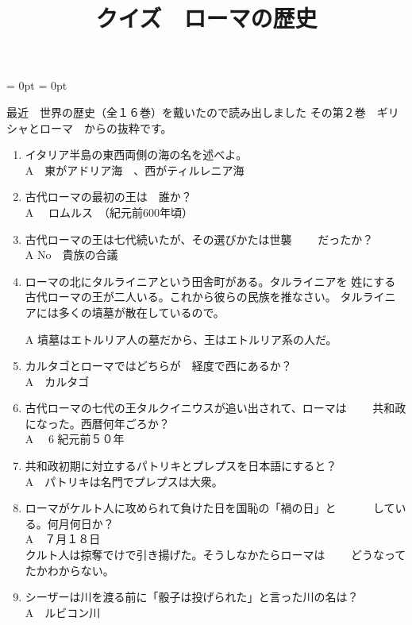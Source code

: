 \documentclass[fleqn]{article}
\begin{document}
\title{クイズ　ローマの歴史}
\maketitle
\hoffset = 0pt
\voffset = 0pt
\topmargin=0pt
\textheight=21cm
\headheight=0pt
\headsep=0pt

最近　世界の歴史（全１６巻）を戴いたので読み出しました
その第２巻　ギリシャとローマ　からの抜粋です。

\begin{enumerate}
\item{
イタリア半島の東西両側の海の名を述べよ。\\
\vspace{1zw}A　東がアドリア海　、西がティルレニア海
}
\item{
古代ローマの最初の王は　誰か？\\
\vspace{1zw}A 　ロムルス　（紀元前600年頃）
}
\item{古代ローマの王は七代続いたが、その選びかたは世襲
　　だったか？\\
\vspace{1zw}A No　貴族の合議
}
\item{ローマの北にタルライニアという田舎町がある。タルライニアを
	姓にする古代ローマの王が二人いる。これから彼らの民族を推なさい。
	タルライニアには多くの墳墓が散在しているので。

\vspace{1zw}A 墳墓はエトルリア人の墓だから、王はエトルリア系の人だ。

}

\item{
 カルタゴとローマではどちらが　経度で西にあるか？\\
\vspace{1zw}A　カルタゴ
}

\item{古代ローマの七代の王タルクイニウスが追い出されて、ローマは
　　共和政になった。西暦何年ごろか？\\
\vspace{1zw}A　 6 紀元前５０年
}
\item{ 共和政初期に対立するパトリキとプレプスを日本語にすると？\\
\vspace{1zw}A　パトリキは名門でプレプスは大衆。
}
\item{
ローマがケルト人に攻められて負けた日を国恥の「禍の日」と
　　　している。何月何日か？\\
\vspace{1zw}A　７月１８日\\
クルト人は掠奪でけで引き揚げた。そうしなかたらローマは
　　どうなってたかわからない。
}
\item{ シーザーは川を渡る前に「骰子は投げられた」と言った川の名は？\\
\vspace{1zw}A　ルビコン川
}


\end{enumerate}
\end{document}
